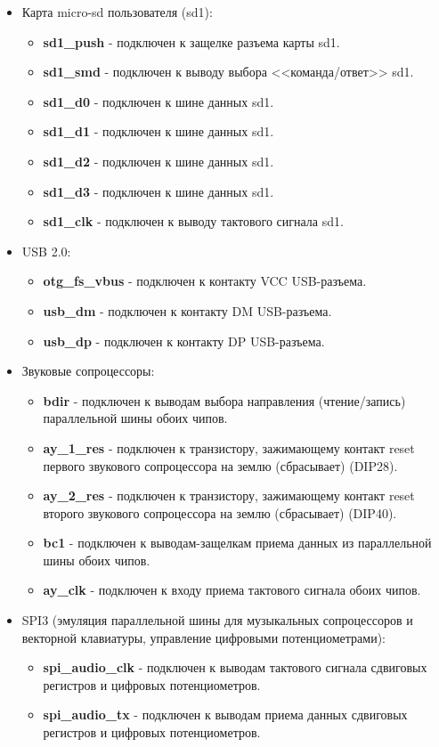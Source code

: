 \documentclass[a4paper, 12pt]{article}
\begin{document}
\begin{itemize}
	\item Карта micro-sd пользователя (sd1):
	\begin{itemize}
		\item \textbf{sd1\_push} - подключен к защелке разъема карты sd1.
		\item \textbf{sd1\_smd} - подключен к выводу выбора <<команда/ответ>> sd1.
		\item \textbf{sd1\_d0} - подключен к шине данных sd1.
		\item \textbf{sd1\_d1} - подключен к шине данных sd1.
		\item \textbf{sd1\_d2} - подключен к шине данных sd1.
		\item \textbf{sd1\_d3} - подключен к шине данных sd1.
		\item \textbf{sd1\_clk} - подключен к выводу тактового сигнала sd1.
	\end{itemize}	
	
	\item USB 2.0:
	\begin{itemize}
		\item \textbf{otg\_fs\_vbus} - подключен к контакту VCC USB-разъема.
		\item \textbf{usb\_dm} - подключен к контакту DM USB-разъема.
		\item \textbf{usb\_dp} - подключен к контакту DP USB-разъема.
	\end{itemize}

	\item Звуковые сопроцессоры:
	\begin{itemize}
		\item \textbf{bdir} - подключен к выводам выбора направления (чтение/запись) параллельной шины обоих чипов.
		\item \textbf{ay\_1\_res} - подключен к транзистору, зажимающему контакт reset первого звукового сопроцессора на землю (сбрасывает) (DIP28).
		\item \textbf{ay\_2\_res} - подключен к транзистору, зажимающему контакт reset второго звукового сопроцессора на землю (сбрасывает) (DIP40).
		\item \textbf{bc1} - подключен к выводам-защелкам приема данных из параллельной шины обоих чипов.
		\item \textbf{ay\_clk} - подключен к входу приема тактового сигнала обоих чипов.
	\end{itemize}
		
	\item SPI3 (эмуляция параллельной шины для музыкальных сопроцессоров и векторной клавиатуры, управление цифровыми потенциометрами):
	\begin{itemize}
		\item \textbf{spi\_audio\_clk} - подключен к выводам тактового сигнала сдвиговых регистров и цифровых потенциометров.
		\item \textbf{spi\_audio\_tx} - подключен к выводам приема данных сдвиговых регистров и цифровых потенциометров.
	\end{itemize}


\end{itemize}
\end{document}
